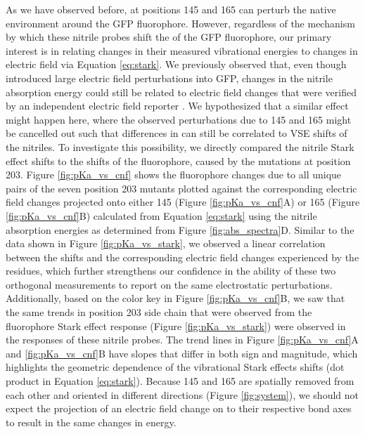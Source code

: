 As we have observed before, \pCNF{} at positions 145 and 165 can perturb the native environment around the GFP fluorophore.
However, regardless of the mechanism by which these nitrile probes shift the \pKa{} of the GFP fluorophore, our primary interest is in relating changes in their measured vibrational energies to changes in electric field via Equation \ref{eq:stark}.
We previously observed that, even though \pCNF{} introduced large electric field perturbations into GFP, changes in the nitrile absorption energy could still be related to electric field changes that were verified by an independent electric field reporter \cite{Slocum2016}.
We hypothesized that a similar effect might happen here, where the observed \pKa{} perturbations due to \pCNF{} 145 and 165 might be cancelled out such that differences in \pKa{} can still be correlated to VSE shifts of the nitriles.
To investigate this possibility, we directly compared the nitrile Stark effect shifts to the \pKa{} shifts of the fluorophore, caused by the mutations at position 203.
Figure \ref{fig:pKa_vs_cnf} shows the fluorophore \pKa{} changes due to all unique pairs of the seven position 203 mutants plotted against the corresponding electric field changes projected onto either \pCNF{} 145 (Figure \ref{fig:pKa_vs_cnf}A) or 165 (Figure \ref{fig:pKa_vs_cnf}B) calculated from Equation \ref{eq:stark} using the nitrile absorption energies as determined from Figure \ref{fig:abs_spectra}D.
Similar to the data shown in Figure \ref{fig:pKa_vs_stark}, we observed a linear correlation between the \pKa{} shifts and the corresponding electric field changes experienced by the \pCNF{} residues, which further strengthens our confidence in the ability of these two orthogonal measurements to report on the same electrostatic perturbations.
Additionally, based on the color key in Figure \ref{fig:pKa_vs_cnf}B, we saw that the same trends in position 203 side chain that were observed from the fluorophore Stark effect response (Figure \ref{fig:pKa_vs_stark}) were observed in the responses of these nitrile probes.
The trend lines in Figure \ref{fig:pKa_vs_cnf}A and \ref{fig:pKa_vs_cnf}B have slopes that differ in both sign and magnitude, which highlights the geometric dependence of the vibrational Stark effects shifts (dot product in Equation \ref{eq:stark}).
Because \pCNF{} 145 and 165 are spatially removed from each other and oriented in different directions (Figure \ref{fig:system}), we should not expect the projection of an electric field change on to their respective bond axes to result in the same changes in energy.

